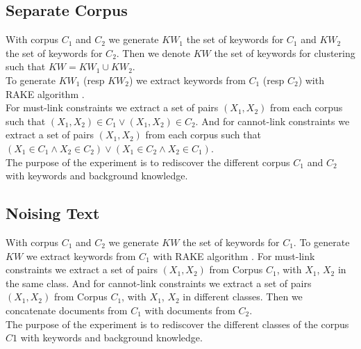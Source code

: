 \subsection{Separate Corpus }
With corpus $C_1$ and $C_2$ we generate $KW_1$ the set of keywords
for $C_1$ and $KW_2$ the set of keywords for $C_2$. Then we denote $KW$
the set of keywords for clustering such that $KW = KW_1 \cup KW_2$.\\
To generate $KW_1$ (resp $KW_2$) we extract keywords from $C_1$ (resp $C_2$)
with RAKE algorithm \cite{rake}.\\
For must-link constraints we extract a set of pairs $(X_1, X_2)$ from each
corpus such that $(X_1, X_2) \in C_1 \vee (X_1, X_2) \in C_2$.
And for cannot-link constraints we extract a set of pairs $(X_1, X_2)$ from
each corpus such that $(X_1 \in C_1 \wedge  X_2 \in C_2)\vee (X_1 \in C_2 \wedge
X_2 \in C_1)$.\\
The purpose of the experiment is to rediscover the different corpus $C_1$ and
$C_2$ with keywords and background knowledge.
\subsection{Noising Text}
With corpus $C_1$ and $C_2$ we generate $KW$ the set of keywords
for $C_1$.
To generate $KW$ we extract keywords from $C_1$ with RAKE algorithm \cite{rake}.
For must-link constraints we extract a set of pairs $(X_1, X_2)$ from Corpus
$C_1$, with $X_1$, $X_2$ in the same class.
And for cannot-link constraints we extract a set of pairs $(X_1, X_2)$ from Corpus
$C_1$, with $X_1$, $X_2$ in different classes.
Then we concatenate documents from $C_1$ with documents from $C_2$.\\
The purpose of the experiment is to rediscover the different classes of the
corpus $C1$ with keywords and background knowledge.
